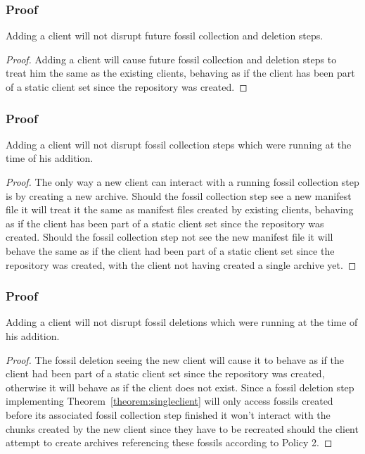 \documentclass[english,utf8,aspectratio=169]{beamer}
\begin{document}
    \begin{frame}
        \frametitle{Proof}
        \begin{lemma}
            \label{lemma:runafteradd}
            Adding a client will not disrupt future fossil collection and deletion steps.
        \end{lemma}
        \begin{proof}
            Adding a client will cause future fossil collection and deletion steps to treat him the
            same as the existing clients, behaving as if the client has been part of a static client
            set since the repository was created.
        \end{proof}
    \end{frame}

    \begin{frame}
        \frametitle{Proof}
        \begin{lemma}
            \label{lemma:collectwhileadd}
            Adding a client will not disrupt fossil collection steps which were running at the
            time of his addition.
        \end{lemma}
        \begin{proof}
            The only way a new client can interact with a running fossil collection step is by
            creating a new archive.
            Should the fossil collection step see a new manifest file it will treat it the same as
            manifest files created by existing clients, behaving as if the client has been part of a
            static client set since the repository was created.
            Should the fossil collection step not see the new manifest file it will behave the same
            as if the client had been part of a static client set since the repository was created,
            with the client not having created a single archive yet.
        \end{proof}
    \end{frame}

    \begin{frame}
        \frametitle{Proof}
        \begin{lemma}
            \label{lemma:deletewhileadd}
            Adding a client will not disrupt fossil deletions which were running at the time of his
            addition.
        \end{lemma}
        \begin{proof}
            The fossil deletion seeing the new client will cause it to behave as if the client had
            been part of a static client set since the repository was created, otherwise it will
            behave as if the client does not exist.
            Since a fossil deletion step implementing Theorem~\ref{theorem:singleclient} will only
            access fossils created before its associated fossil collection step finished it won't
            interact with the chunks created by the new client since they have to be recreated
            should the client attempt to create archives referencing these fossils according to
            Policy 2.
        \end{proof}
    \end{frame}
\end{document}

